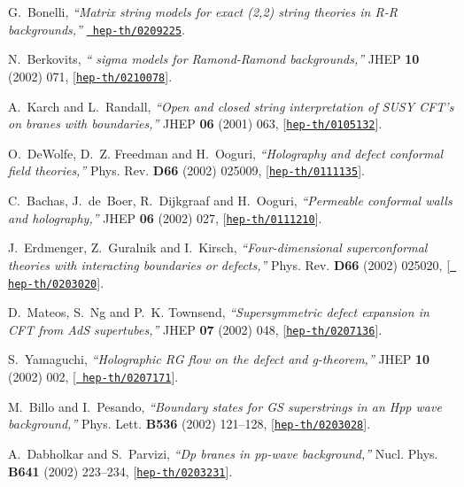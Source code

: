 \documentclass[a4paper,12pt]{article}
\numberwithin{equation}{section}
\begin{document}
\begin{thebibliography}{10}
G.~Bonelli, {\it ``Matrix string models for exact (2,2) string theories in
  {R-R} backgrounds,''}  \href{http://arXiv.org/abs/hep-th/0209225}{{\tt
  hep-th/0209225}}.

N.~Berkovits, {\it ``{\coordHE{}} sigma models for {R}amond-{R}amond
  backgrounds,''}  JHEP {\bf 10} (2002) 071,
  [\href{http://arXiv.org/abs/hep-th/0210078}{{\tt hep-th/0210078}}].

A.~Karch and L.~Randall, {\it ``Open and closed string interpretation of {SUSY}
  {CFT}'s on branes with boundaries,''}  JHEP {\bf 06} (2001) 063,
  [\href{http://arXiv.org/abs/hep-th/0105132}{{\tt hep-th/0105132}}].

O.~DeWolfe, D.~Z. Freedman and H.~Ooguri, {\it ``Holography and defect
  conformal field theories,''}  Phys. Rev. {\bf D66} (2002) 025009,
  [\href{http://arXiv.org/abs/hep-th/0111135}{{\tt hep-th/0111135}}].

C.~Bachas, J.~de~Boer, R.~Dijkgraaf and H.~Ooguri, {\it ``Permeable conformal
  walls and holography,''}  JHEP {\bf 06} (2002) 027,
  [\href{http://arXiv.org/abs/hep-th/0111210}{{\tt hep-th/0111210}}].

J.~Erdmenger, Z.~Guralnik and I.~Kirsch, {\it ``Four-dimensional superconformal
  theories with interacting boundaries or defects,''}  Phys. Rev. {\bf D66}
  (2002) 025020, [\href{http://arXiv.org/abs/hep-th/0203020}{{\tt
  hep-th/0203020}}].

D.~Mateos, S.~Ng and P.~K. Townsend, {\it ``Supersymmetric defect expansion in
  {CFT} from {AdS} supertubes,''}  JHEP {\bf 07} (2002) 048,
  [\href{http://arXiv.org/abs/hep-th/0207136}{{\tt hep-th/0207136}}].

S.~Yamaguchi, {\it ``Holographic {RG} flow on the defect and g-theorem,''}
  JHEP {\bf 10} (2002) 002, [\href{http://arXiv.org/abs/hep-th/0207171}{{\tt
  hep-th/0207171}}].

M.~Billo and I.~Pesando, {\it ``Boundary states for {GS} superstrings in an
  {H}pp wave background,''}  Phys. Lett. {\bf B536} (2002) 121--128,
  [\href{http://arXiv.org/abs/hep-th/0203028}{{\tt hep-th/0203028}}].

A.~Dabholkar and S.~Parvizi, {\it ``{D}p branes in pp-wave background,''}
  Nucl. Phys. {\bf B641} (2002) 223--234,
  [\href{http://arXiv.org/abs/hep-th/0203231}{{\tt hep-th/0203231}}].


\end{thebibliography}
\end{document}
